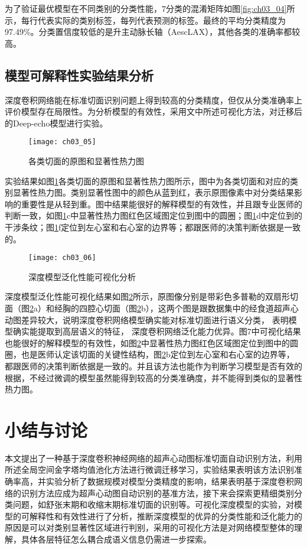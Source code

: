 为了验证最优模型在不同类别的分类性能，7分类的混淆矩阵如图\ref{fig:ch03_04}所示，每行代表实际的类别标签，每列代表预测的标签。最终的平均分类精度为97.49\%。分类置信度较低的是升主动脉长轴（AescLAX），其他各类的准确率都较高。

\subsection{模型可解释性实验结果分析}
深度卷积网络能在标准切面识别问题上得到较高的分类精度，但仅从分类准确率上评价模型存在局限性。为分析模型的有效性，采用文中所述可视化方法，对迁移后的Deep-echo模型进行实验。
\begin{figure}[!htbp]
\centering
\texttt{[image: ch03\_05]}
\caption{各类切面的原图和显著性热力图}
\label{fig:ch03_05}
\end{figure}  
 
实验结果如图\ref{fig:ch03_05}各类切面的原图和显著性热力图所示，图中为各类切面和对应的类别显著性热力图。类别显著性图中的颜色从蓝到红，表示原图像素中对分类结果影响的重要性是从轻到重。图中结果能很好的解释模型的有效性，并且跟专业医师的判断一致，如图\ref{fig:ch03_05}c中显著性热力图红色区域图定位到图中的圆圈；图\ref{fig:ch03_05}d中定位到的干涉条纹；图\ref{fig:ch03_05}f定位到左心室和右心室的边界等；都跟医师的决策判断依据是一致的。
\begin{figure}[!htbp]
\centering
\texttt{[image: ch03\_06]}
\caption{深度模型泛化性能可视化分析}
\label{fig:ch03_06}
\end{figure}  
  
深度模型泛化性能可视化结果如图\ref{fig:ch03_06}所示，原图像分别是带彩色多普勒的双扇形切面（图\ref{fig:ch03_06}a）和经胸的四腔心切面（图\ref{fig:ch03_06}b），这两个图是跟数据集中的经食道超声心动图差异较大，说明深度卷积网络模型确实能对标准切面进行语义分类， 表明模型确实能提取到高层语义的特征， 深度卷积网络泛化能力优异。图7中可视化结果也能很好的解释模型的有效性，如图\ref{fig:ch03_06}中显著性热力图红色区域图定位到图中的圆圈，也是医师认定该切面的关键性结构，图\ref{fig:ch03_06}b定位到左心室和右心室的边界等，都跟医师的决策判断依据是一致的。并且该方法也能作为判断学习模型是否有效的根据，不经过微调的模型虽然能得到较高的分类准确度，并不能得到类似的显著性热力图。

\section{小结与讨论}

本文提出了一种基于深度卷积神经网络的超声心动图标准切面自动识别方法，利用所述全局空间金字塔均值池化方法进行微调迁移学习，实验结果表明该方法识别准确率高，并实验分析了数据规模对模型分类精度的影响，结果表明基于深度卷积网络的识别方法应成为超声心动图自动识别的基准方法，接下来会探索更精细类别分类问题，如舒张末期和收缩末期标准切面的识别等。可视化深度模型的实验，对模型的可解释性和有效性进行了分析，推断深度模型的优异的分类性能和泛化能力的原因是可以对类别显著性区域进行判别，采用的可视化方法是对网络模型整体的理解，具体各层特征怎么耦合成语义信息仍需进一步探索。




